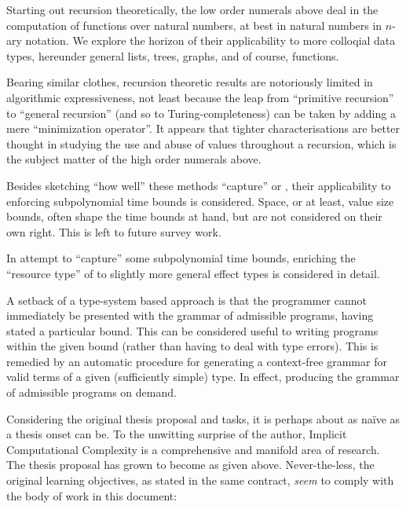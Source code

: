 Starting out recursion theoretically, the low order numerals above deal in the
computation of functions over natural numbers, at best in natural numbers in
$n$-ary notation.  We explore the horizon of their applicability to more
colloqial data types, hereunder general lists, trees, graphs, and of course,
functions.

Bearing similar clothes, recursion theoretic results are notoriously limited in
algorithmic expressiveness, not least because the leap from ``primitive
recursion'' to ``general recursion'' (and so to Turing-completeness) can be
taken by adding a mere ``minimization operator''. It appears that tighter
characterisations are better thought in studying the use and abuse of values
throughout a recursion, which is the subject matter of the high order numerals
above.

Besides sketching ``how well'' these methods ``capture'' \PTIME{} or \FPTIME{},
their applicability to enforcing subpolynomial time bounds is considered.
Space, or at least, value size bounds, often shape the time bounds at hand, but
are not considered on their own right. This is left to future survey work.

In attempt to ``capture'' some subpolynomial time bounds, enriching the
``resource type'' of \cite{hofmann-2003, aehlig-schwichtenberg-2002} to
slightly more general effect types\cite{gifford-lucassen-1986} is considered in
detail.

A setback of a type-system based approach is that the programmer cannot
immediately be presented with the grammar of admissible programs, having stated
a particular bound. This can be considered useful to writing programs within
the given bound (rather than having to deal with type errors). This is remedied
by an automatic procedure for generating a context-free grammar for valid terms
of a given (sufficiently simple) type.  In effect, producing the grammar of
admissible programs on demand.

Considering the original thesis proposal and tasks, it is perhaps about as
na\"ive as a thesis onset can be. To the unwitting surprise of the author,
Implicit Computational Complexity is a comprehensive and manifold area of
research. The thesis proposal has grown to become as given above.
Never-the-less, the original learning objectives, as stated in the same
contract, \emph{seem} to comply with the body of work in this document:

